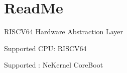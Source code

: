 \chapter{Read\+Me}
\hypertarget{md_dev_2kernel_2_h_a_l_kit_2_r_i_s_c_v_2_read_me}{}\label{md_dev_2kernel_2_h_a_l_kit_2_r_i_s_c_v_2_read_me}
RISCV64 Hardware Abstraction Layer


\begin{DoxyItemize}
\item Supported CPU\+: RISCV64
\item Supported \+: Ne\+Kernel Core\+Boot 
\end{DoxyItemize}